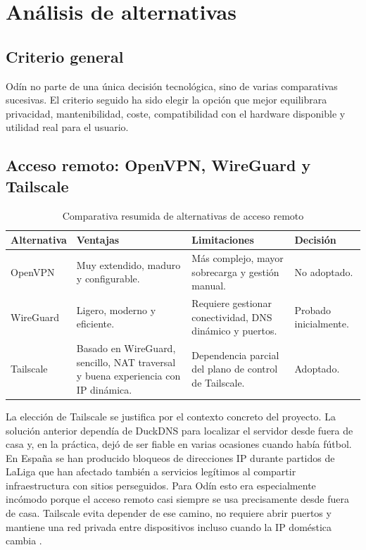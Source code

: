 \chapter{Análisis de alternativas}

\section{Criterio general}
Odín no parte de una única decisión tecnológica, sino de varias comparativas sucesivas. El criterio seguido ha sido elegir la opción que mejor equilibrara privacidad, mantenibilidad, coste, compatibilidad con el hardware disponible y utilidad real para el usuario.

\section{Acceso remoto: OpenVPN, WireGuard y Tailscale}
\begin{table}[H]
  \centering
  \caption{Comparativa resumida de alternativas de acceso remoto}
  \label{tab:comparativa-vpn}
  \begin{tabularx}{\textwidth}{lXXX}
    \toprule
    Alternativa & Ventajas & Limitaciones & Decisión \\
    \midrule
    OpenVPN & Muy extendido, maduro y configurable. & Más complejo, mayor sobrecarga y gestión manual. & No adoptado. \\
    WireGuard & Ligero, moderno y eficiente. & Requiere gestionar conectividad, DNS dinámico y puertos. & Probado inicialmente. \\
    Tailscale & Basado en WireGuard, sencillo, NAT traversal y buena experiencia con IP dinámica. & Dependencia parcial del plano de control de Tailscale. & Adoptado. \\
    \bottomrule
  \end{tabularx}
\end{table}

La elección de Tailscale se justifica por el contexto concreto del proyecto. La solución anterior dependía de DuckDNS para localizar el servidor desde fuera de casa y, en la práctica, dejó de ser fiable en varias ocasiones cuando había fútbol. En España se han producido bloqueos de direcciones IP durante partidos de LaLiga que han afectado también a servicios legítimos al compartir infraestructura con sitios perseguidos. Para Odín esto era especialmente incómodo porque el acceso remoto casi siempre se usa precisamente desde fuera de casa. Tailscale evita depender de ese camino, no requiere abrir puertos y mantiene una red privada entre dispositivos incluso cuando la IP doméstica cambia \citep{openvpnHowTo,wireguardDocs,tailscaleConnectivity,tailscaleDynamicIp,laligaBlocksElPais,bandaanchaBloqueosFutbol}.

